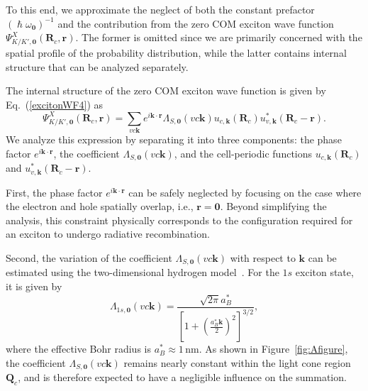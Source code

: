 To this end, we approximate the neglect of both the constant prefactor $\left(\hslash \omega_{\boldsymbol{0}}\right)^{-1}$ and the contribution from the zero COM exciton wave function $\Psi^{X}_{K/K',\boldsymbol{0}}(\boldsymbol{R}_c,\boldsymbol{r})$. The former is omitted since we are primarily concerned with the spatial profile of the probability distribution, while the latter contains internal structure that can be analyzed separately.

\noindent
The internal structure of the zero COM exciton wave function is given by Eq.~(\ref{excitonWF4}) as
\begin{equation}
\Psi^{X}_{K/K',\boldsymbol{0}}
(\boldsymbol{R}_c,\boldsymbol{r})
=
\sum_{vc\boldsymbol{k}}
e^{i\boldsymbol{k}\cdot\boldsymbol{r}}
\Lambda_{S,\boldsymbol{0}}(vc\boldsymbol{k})
u_{c,\boldsymbol{k}}(\boldsymbol{R}_c)
u^{*}_{v,\boldsymbol{k}}
(\boldsymbol{R}_c-\boldsymbol{r}).
\end{equation}
\noindent
We analyze this expression by separating it into three components: the phase factor $e^{i\boldsymbol{k}\cdot\boldsymbol{r}}$, the coefficient $\Lambda_{S,\boldsymbol{0}}(vc\boldsymbol{k})$, and the cell-periodic functions $u_{c,\boldsymbol{k}}(\boldsymbol{R}_c)$ and $u^{*}_{v,\boldsymbol{k}}(\boldsymbol{R}_c-\boldsymbol{r})$.

\noindent
First, the phase factor $e^{i\boldsymbol{k}\cdot\boldsymbol{r}}$ can be safely neglected by focusing on the case where the electron and hole spatially overlap, i.e., $\boldsymbol{r} = \boldsymbol{0}$. Beyond simplifying the analysis, this constraint physically corresponds to the configuration required for an exciton to undergo radiative recombination.

\noindent
Second, the variation of the coefficient $\Lambda_{S,\boldsymbol{0}}(vc\boldsymbol{k})$ with respect to $\boldsymbol{k}$ can be estimated using the two-dimensional hydrogen model~\cite{parfitt2002twodimensional}. For the $1s$ exciton state, it is given by
\begin{equation}
\Lambda_{1s,\boldsymbol{0}}(vc\boldsymbol{k})
=
\frac{\sqrt{2\pi} a_{B}^{*}}
{\left[1+\left(\frac{ a_{B}^{*} \boldsymbol{k} }{2}\right)^2\right]^{3/2}},
\end{equation}
where the effective Bohr radius is $a_{B}^{*} \approx 1\,\mathrm{nm}$. As shown in Figure~\ref{fig:Afigure}, the coefficient $\Lambda_{S,\boldsymbol{0}}(vc\boldsymbol{k})$ remains nearly constant within the light cone region $\boldsymbol{Q}_c$, and is therefore expected to have a negligible influence on the summation.

